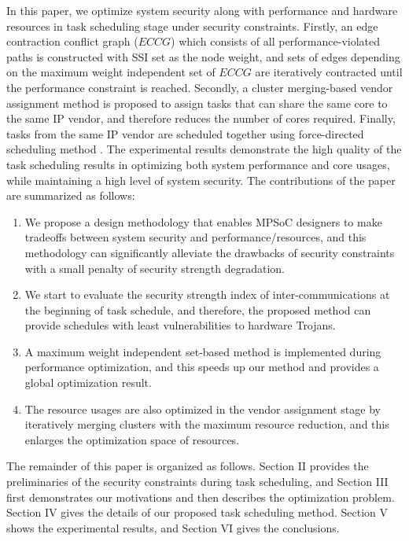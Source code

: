 \documentclass[10pt,journal]{IEEEtran}
\begin{document}
In this paper, we optimize system security along with performance and hardware resources in task scheduling stage under security constraints. Firstly, an edge contraction conflict graph ($ECCG$) which consists of all  performance-violated paths is constructed with SSI set as the node weight, and sets of edges depending on the maximum weight independent set of $ECCG$ are iteratively contracted until the performance constraint is reached. Secondly, a cluster merging-based vendor assignment method is proposed to assign tasks that can share the same core to the same IP vendor, and therefore reduces the number of cores required. Finally, tasks from the same IP vendor are scheduled together using force-directed scheduling method \cite{article:PP}. The experimental results demonstrate the high quality of the task scheduling results in optimizing both system performance and core usages, while maintaining a high level of system security. The contributions of the paper are summarized as follows:
\begin{enumerate}

\item We propose a design methodology that enables MPSoC designers to make tradeoffs between system security and performance/resources, and this methodology can significantly alleviate the drawbacks of security constraints with a small penalty of security strength degradation.

\item We start to evaluate the security strength index of inter-communications at the beginning of task schedule, and therefore, the proposed method can provide schedules with least vulnerabilities to hardware Trojans.

\item A maximum weight independent set-based method is implemented during performance optimization, and this speeds up our method and provides a global optimization result.

\item The resource usages are also optimized in the vendor assignment stage by iteratively merging clusters with the maximum resource reduction, and this enlarges the optimization space of resources.
\end{enumerate}

The remainder of this paper is organized as follows. Section II provides the preliminaries of the security constraints during task scheduling, and Section III first demonstrates our motivations and then describes the optimization problem. Section IV gives the details of our proposed task scheduling method. Section V shows the experimental results, and Section VI gives the conclusions.
\end{document}
